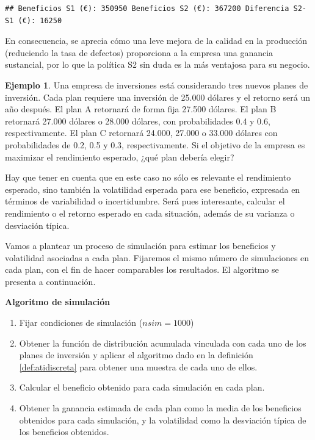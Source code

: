 \documentclass[
]{book}
\providecommand{\tightlist}{%
  \setlength{\itemsep}{0pt}\setlength{\parskip}{0pt}}
\newenvironment{silverbox}{
  \definecolor{shadecolor}{rgb}{192, 192, 192}  
  \color{black}
  \begin{shaded}}
 {\end{shaded}}
\theoremstyle{definition}
\theoremstyle{definition}
\newtheorem{example}{Ejemplo}[chapter]
\theoremstyle{definition}
\theoremstyle{definition}
\theoremstyle{remark}
\begin{document}
\begin{verbatim}
## Beneficios S1 (€): 350950 Beneficios S2 (€): 367200 Diferencia S2-S1 (€): 16250
\end{verbatim}

En consecuencia, se aprecia cómo una leve mejora de la calidad en la producción (reduciendo la tasa de defectos) proporciona a la empresa una ganancia sustancial, por lo que la política S2 sin duda es la más ventajosa para su negocio.

\begin{example}
\protect\hypertarget{exm:discreta2}{}\label{exm:discreta2}Una empresa de inversiones está considerando tres nuevos planes de inversión. Cada plan requiere una inversión de 25.000 dólares y el retorno será un año después. El plan A retornará de forma fija 27.500 dólares. El plan B retornará 27.000 dólares o 28.000 dólares, con probabilidades 0.4 y 0.6, respectivamente. El plan C retornará 24.000, 27.000 o 33.000 dólares con probabilidades de 0.2, 0.5 y 0.3, respectivamente. Si el objetivo de la empresa es maximizar el rendimiento esperado, ¿qué plan debería elegir?
\end{example}

Hay que tener en cuenta que en este caso no sólo es relevante el rendimiento esperado, sino también la volatilidad esperada para ese beneficio, expresada en términos de variabilidad o incertidumbre. Será pues interesante, calcular el rendimiento o el retorno esperado en cada situación, además de su varianza o desviación típica.

Vamos a plantear un proceso de simulación para estimar los beneficios y volatilidad asociadas a cada plan. Fijaremos el mismo número de simulaciones en cada plan, con el fin de hacer comparables los resultados. El algoritmo se presenta a continuación.

\begin{silverbox}

\textbf{Algoritmo de simulación}

\begin{enumerate}
\def\labelenumi{\arabic{enumi}.}
\tightlist
\item
  Fijar condiciones de simulación (\(nsim = 1000\))
\item
  Obtener la función de distribución acumulada vinculada con cada uno de los planes de inversión y aplicar el algoritmo dado en la definición \ref{def:atidiscreta} para obtener una muestra de cada uno de ellos.
\item
  Calcular el beneficio obtenido para cada simulación en cada plan.
\item
  Obtener la ganancia estimada de cada plan como la media de los beneficios obtenidos para cada simulación, y la volatilidad como la desviación típica de los beneficios obtenidos.
\end{enumerate}

\end{silverbox}
\end{document}
